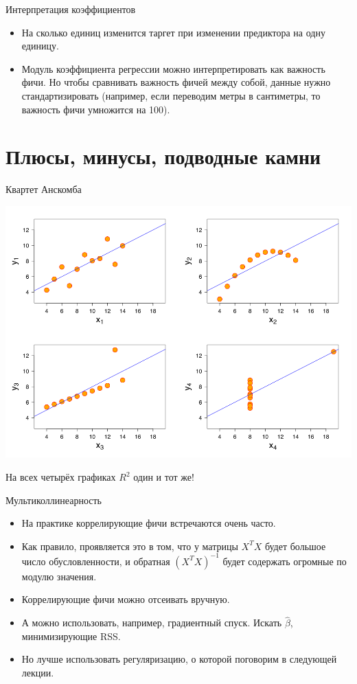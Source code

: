 \documentclass[9pt]{beamer}
\begin{document}
\begin{frame}{Интерпретация коэффициентов}
\begin{itemize}
    \item На сколько единиц изменится таргет при изменении предиктора на одну единицу.
    \item Модуль коэффициента регрессии можно интерпретировать как важность фичи. Но чтобы сравнивать важность фичей между собой, данные нужно стандартизировать (например, если переводим метры в сантиметры, то важность фичи умножится на 100).
\end{itemize}
\end{frame}

\section{Плюсы, минусы, подводные камни}
\begin{frame}{Квартет Анскомба}
    \begin{center}
        \includegraphics[height=0.7\textheight]{img/linear_regression_anscombes_quartet.png}        
    \end{center}
    На всех четырёх графиках $R^2$ один и тот же!
\end{frame}

\begin{frame}{Мультиколлинеарность}
    \begin{itemize}
        \item На практике коррелирующие фичи встречаются очень часто.
        \item Как правило, проявляется это в том, что у матрицы $X^TX$ будет большое число обусловленности, и обратная $(X^TX)^{-1}$ будет содержать огромные по модулю значения.
        \item Коррелирующие фичи можно отсеивать вручную.
        \item А можно использовать, например, градиентный спуск. Искать $\hat \beta$, минимизирующие RSS.
        \item Но лучше использовать регуляризацию, о которой поговорим в следующей лекции.
    \end{itemize}
\end{frame}
\end{document}
